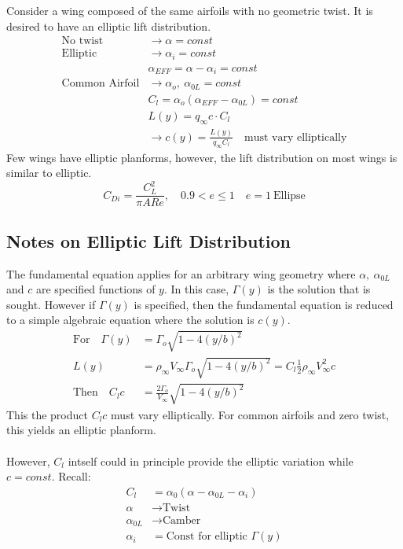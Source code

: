 \documentclass[draft=false, titlepage]{article}
\begin{document}
Consider a wing composed of the same airfoils with no geometric twist. It is desired to have an elliptic lift distribution.
\begin{align*}
    \text{No twist} & \rightarrow \alpha = const\\
    \text{Elliptic} & \rightarrow \alpha_i = const\\
    & \alpha_{EFF} = \alpha - \alpha_i = const\\
    \text{Common Airfoil} & \rightarrow \alpha_o,\ \alpha_{0L} = const\\
    & C_l = \alpha_o(\alpha_{EFF} - \alpha_{0L}) = const\\
    & L(y) = q_\infty c \cdot C_l\\
    & \rightarrow c(y) = \frac{L(y)}{q_\infty C_l} \quad \text{must vary elliptically}
\end{align*}
Few wings have elliptic planforms, however, the lift distribution on most wings is similar to elliptic.
\begin{equation*}
    C_{Di} = \frac{C_L^2}{\pi AR e},\quad 0.9 < e \le 1 \quad e=1 \ \text{Ellipse}
\end{equation*}

\subsection{Notes on Elliptic Lift Distribution}
The fundamental equation applies for an arbitrary wing geometry where $\alpha,\ \alpha_{0L}$ and $c$ are specified functions of $y$. In this case, $\Gamma(y)$ is the solution that is sought. However if $\Gamma(y)$ is specified, then the fundamental equation is reduced to a simple algebraic equation where the solution is $c(y)$.
\begin{align*}
    \text{For} \quad \Gamma(y) &= \Gamma_o \sqrt{1-4(y/b)^2}\\
    L(y) &= \rho_\infty V_\infty \Gamma_o \sqrt{1-4(y/b)^2} = C_l \frac{1}{2}\rho_\infty V_\infty^2 c\\
    \text{Then} \quad C_l c &= \frac{2\Gamma_o}{V_\infty} \sqrt{1-4(y/b)^2}
\end{align*}
This the product $C_l c$ must vary elliptically. For common airfoils and zero twist, this yields an elliptic planform.
\paragraph*{} However, $C_l$ intself could in principle provide the elliptic variation while $c=const$. Recall:
\begin{align*}
    C_l &= \alpha_0(\alpha - \alpha_{0L} - \alpha_i)\\
    \alpha &\rightarrow \text{Twist}\\
    \alpha_{0L} &\rightarrow \text{Camber}\\
    \alpha_i &= \text{Const for elliptic } \Gamma(y)
\end{align*}
\end{document}
